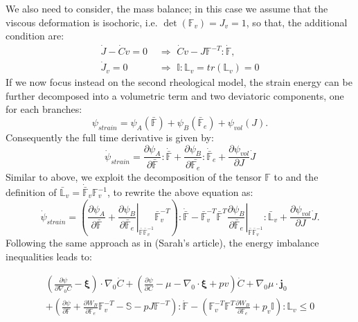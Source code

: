 \documentclass[12pt]{extarticle}
\newcommand{\F}{\ensuremath{\mathbb{F}}}
\newcommand{\LL}{\ensuremath{\mathbb{L}}}
\begin{document}
We also need to consider, the mass balance; in this case we assume that the viscous deformation is isochoric, i.e. $\det(\F_v)=J_v=1$, so that, the additional condition are:
\begin{equation}
 \begin{aligned}
 \dot{J} - \dot{C}v=0&\,\,\Longrightarrow\,\,\dot{C}v-J\F^{-T}:\dot{\F},\\
 \dot{J}_v=0 &\,\,\Longrightarrow \,\,\mathbb{I}:\LL_v=tr(\LL_v)=0
 \end{aligned}
\end{equation}
If we now focus instead on the second rheological model, the strain energy can be further decomposed into a volumetric term and two deviatoric components, one for each branches:
\begin{equation}
\psi_{strain}=\psi_{A}(\bar{\F})+\psi_{B}(\bar{\F}_e)+ \psi_{vol}(J).
\end{equation}
Consequently the full time derivative is given by:
\begin{equation}
\dot{\psi}_{strain}= \frac{\partial \psi_A}{\partial \bar{\F}}:\dot{\bar{\F}} +  \frac{\partial \psi_B}{\partial \bar{\F_e}}:\dot{\bar{\F}}_e + \frac{\partial \psi_{vol}}{\partial J} \dot{J}
\end{equation}
Similar to above, we exploit the decomposition of the tensor $\F$ to and the definition of $\bar{\LL}_v= \dot{\bar{\F}}_v\F_v^{-1}$, to rewrite the above equation as:
\begin{equation}
\dot{\psi}_{strain}=\left(\frac{\partial \psi_A}{\partial \bar{\F}}+  \left.\frac{\partial \psi_B}{\partial \bar{\F}_e}\right|_{\bar{\F}\bar{\F}_v^{-1}}\bar{\F}_v^{-T}\right):\dot{\bar{\F}}-\bar{\F}_v^{-T}\bar{\F}^T\left.\frac{\partial \psi_B}{\partial \bar{\F}_e}\right|_{\bar{\F}\bar{\F}_v^{-1}}:\bar{\LL}_v + \frac{\partial \psi_{vol}}{\partial J} \dot{J}.
\end{equation}
Following the same approach as in (Sarah's article), the energy imbalance inequalities leads to:

\begin{equation}
\begin{aligned}
\left(\frac{\partial \psi}{\partial \nabla_0 C}-\boldsymbol{\xi}\right)\cdot \nabla_0 \dot{C} + \left(\frac{\partial \psi}{\partial C}-\mu-\nabla_0\cdot\boldsymbol{\xi}+ p v\right) \dot{C}+ \nabla_0 \mu \cdot \mathbf{j}_0 \\
+\left(\frac{\partial \psi}{\partial \F} + \frac{\partial W_B}{\partial \F_e}\F_v^{-T}- \mathbb{S} - p J \F^{-T}\right):\dot{\F}- \left(\F_v^{-T}\F^T \frac{\partial W_B}{\partial \F_e}+p_v  \mathbb{I}\right):\LL_v \leq 0
\end{aligned}
\label{dis}
\end{equation}
\end{document}

